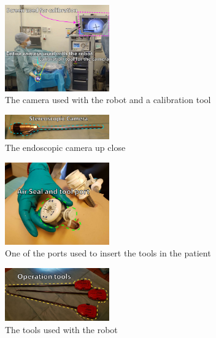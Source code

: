 \begin{figure}[hbpt]
	\centering
	\includegraphics[width=0.4\textwidth]{FieldStudies/figures/camera.pdf}
	\caption{The camera used with the robot and a calibration tool}
	\label{fig:camera}
\end{figure}

\begin{figure}[hbpt]
	\centering
	\includegraphics[width=0.4\textwidth]{FieldStudies/figures/camera_close}
	\caption{The endoscopic camera up close}
	\label{fig:cam_close}
\end{figure}

\begin{figure}[hbpt]
	\centering
	\includegraphics[width=0.4\textwidth]{FieldStudies/figures/port}
	\caption{One of the ports used to insert the tools in the patient}
	\label{fig:port}
\end{figure}

\begin{figure}[hbpt]
	\centering
	\includegraphics[width=0.4\textwidth]{FieldStudies/figures/tools}
	\caption{The tools used with the robot}
	\label{fig:tools}
\end{figure}


